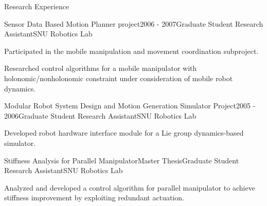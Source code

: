 \begin{rSection}{Research Experience}
\begin{rSubsection}{Sensor Data Based Motion Planner project}{2006 - 2007}{Graduate Student Research Assistant}{SNU Robotics Lab}
  \item Participated in the mobile manipulation and movement coordination subproject.
  \item Researched control algorithms for a mobile manipulator with holonomic/nonholonomic constraint under consideration of mobile robot dynamics.
\end{rSubsection}

\begin{rSubsection}{Modular Robot System Design and Motion Generation Simulator Project}{2005 - 2006}{Graduate Student Research Assistant}{SNU Robotics Lab}
  \item Developed robot hardware interface module for a Lie group dynamics-based simulator.
\end{rSubsection}

\begin{rSubsection}{Stiffness Analysis for Parallel Manipulator}{Master Thesis}{Graduate Student Research Assistant}{SNU Robotics Lab}
  \item Analyzed and developed a control algorithm for parallel manipulator to achieve stiffness improvement by exploiting redundant actuation.
\end{rSubsection}

\end{rSection}

